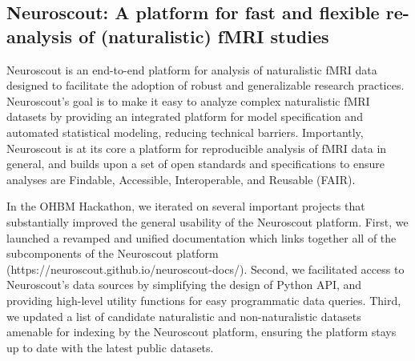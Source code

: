 \documentclass[../main.tex]{subfiles}
\begin{document}
\subsection{Neuroscout: A platform for fast and flexible re-analysis of (naturalistic) fMRI studies}

%


Neuroscout is an end-to-end platform for analysis of naturalistic fMRI data designed to facilitate the adoption of robust and generalizable research practices. Neuroscout’s goal is to make it easy to analyze complex naturalistic fMRI datasets by providing an integrated platform for model specification and automated statistical modeling, reducing technical barriers. Importantly, Neuroscout is at its core a platform for reproducible analysis of fMRI data in general, and builds upon a set of open standards and specifications to ensure analyses are Findable, Accessible, Interoperable, and Reusable (FAIR). 

In the OHBM Hackathon, we iterated on several important projects that substantially improved the general usability of the Neuroscout platform. First, we launched a revamped and unified documentation which links together all of the subcomponents of the Neuroscout platform (https://neuroscout.github.io/neuroscout-docs/). Second, we facilitated access to Neuroscout’s data sources by simplifying the design of Python API, and providing high-level utility functions for easy programmatic data queries. Third, we updated a list of candidate naturalistic and non-naturalistic datasets amenable for indexing by the Neuroscout platform, ensuring the platform stays up to date with the latest public datasets. 
\end{document}
